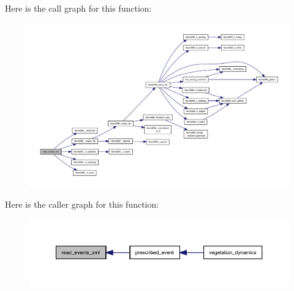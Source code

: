 Here is the call graph for this function\+:
\nopagebreak
\begin{figure}[H]
\begin{center}
\leavevmode
\includegraphics[width=350pt]{events_8f90_a88f99ba09eb95b65d497f6bd8bddaa65_cgraph}
\end{center}
\end{figure}
Here is the caller graph for this function\+:
\nopagebreak
\begin{figure}[H]
\begin{center}
\leavevmode
\includegraphics[width=350pt]{events_8f90_a88f99ba09eb95b65d497f6bd8bddaa65_icgraph}
\end{center}
\end{figure}
